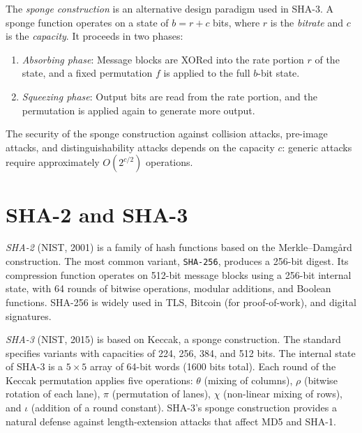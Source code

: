 \documentclass[a4paper, 12pt]{book} %
\begin{document}
\begin{definition}
    The \emph{sponge construction} is an alternative design paradigm used in SHA-3. A sponge function operates on a state of $b = r + c$ bits, where $r$ is the \emph{bitrate} and $c$ is the \emph{capacity}. It proceeds in two phases:
    \begin{enumerate}
        \item \emph{Absorbing phase}: Message blocks are XORed into the rate portion $r$ of the state, and a fixed permutation $f$ is applied to the full $b$-bit state.
        \item \emph{Squeezing phase}: Output bits are read from the rate portion, and the permutation is applied again to generate more output.
    \end{enumerate}
    The security of the sponge construction against collision attacks, pre-image attacks, and distinguishability attacks depends on the capacity $c$: generic attacks require approximately $O(2^{c/2})$ operations.
\end{definition}

\section{SHA-2 and SHA-3}

\begin{example}
    \emph{SHA-2} (NIST, 2001) is a family of hash functions based on the Merkle--Damg\aa rd construction. The most common variant, \texttt{SHA-256}, produces a 256-bit digest. Its compression function operates on 512-bit message blocks using a 256-bit internal state, with 64 rounds of bitwise operations, modular additions, and Boolean functions. SHA-256 is widely used in TLS, Bitcoin (for proof-of-work), and digital signatures.
\end{example}

\begin{example}
    \emph{SHA-3} (NIST, 2015) is based on Keccak, a sponge construction. The standard specifies variants with capacities of 224, 256, 384, and 512 bits. The internal state of SHA-3 is a $5 \times 5$ array of 64-bit words (1600 bits total). Each round of the Keccak permutation applies five operations: $\theta$ (mixing of columns), $\rho$ (bitwise rotation of each lane), $\pi$ (permutation of lanes), $\chi$ (non-linear mixing of rows), and $\iota$ (addition of a round constant). SHA-3's sponge construction provides a natural defense against length-extension attacks that affect MD5 and SHA-1.
\end{example}
\end{document}
